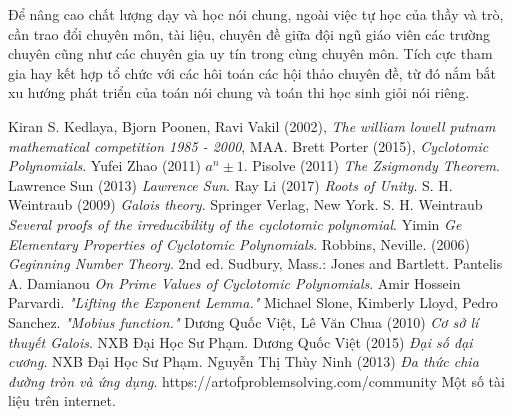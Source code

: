Để nâng cao chất lượng dạy và học nói chung, ngoài việc tự học của thầy và trò, cần trao đổi chuyên môn, tài liệu, chuyên đề giữa đội ngũ giáo viên các trường chuyên cũng như các chuyên gia uy tín trong cùng chuyên môn. Tích cực tham gia hay kết hợp tổ chức với các hôi toán các hội thảo chuyên đề, từ đó nắm bắt xu hướng phát triển của toán nói chung và toán thi học sinh giỏi nói riêng.








\begin{thebibliography}{12}
	Kiran S. Kedlaya, Bjorn Poonen, Ravi Vakil (2002),\textit{ The william lowell putnam mathematical competition 1985 - 2000}, MAA.
	Brett Porter (2015),\textit{ Cyclotomic Polynomials}.
	Yufei Zhao (2011) $a^n \pm 1$.
	Pisolve (2011) \textit{ The Zsigmondy Theorem}.
	Lawrence Sun (2013) \textit{ Lawrence Sun}.
	 Ray Li (2017) \textit{ Roots of Unity}.
	 S. H. Weintraub (2009) \textit{ Galois theory}. Springer Verlag, New York.
	 S. H. Weintraub \textit{ Several proofs of the irreducibility of the cyclotomic polynomial}.
	 Yimin  \textit{Ge Elementary   Properties of Cyclotomic Polynomials}.
	 Robbins, Neville. (2006)  \textit{ Geginning Number Theory}. 2nd ed. Sudbury, Mass.: Jones and Bartlett.
	 Pantelis A. Damianou  \textit{On Prime Values of Cyclotomic Polynomials}.
	 Amir Hossein Parvardi.  \textit{"Lifting the Exponent Lemma."}
	 Michael Slone, Kimberly Lloyd, Pedro Sanchez.  \textit{"Mobius function."}
	 Dương Quốc Việt, Lê Văn Chua (2010)  \textit{Cơ sở lí thuyết Galois}. NXB Đại Học Sư Phạm.
	 Dương Quốc Việt (2015) \textit{Đại số đại cương}. NXB Đại Học Sư Phạm.
	 Nguyễn Thị Thùy Ninh (2013)  \textit{Đa thức chia đường tròn và ứng dụng}.
	 https://artofproblemsolving.com/community
	 Một số tài liệu trên internet. 
	
\end{thebibliography}


